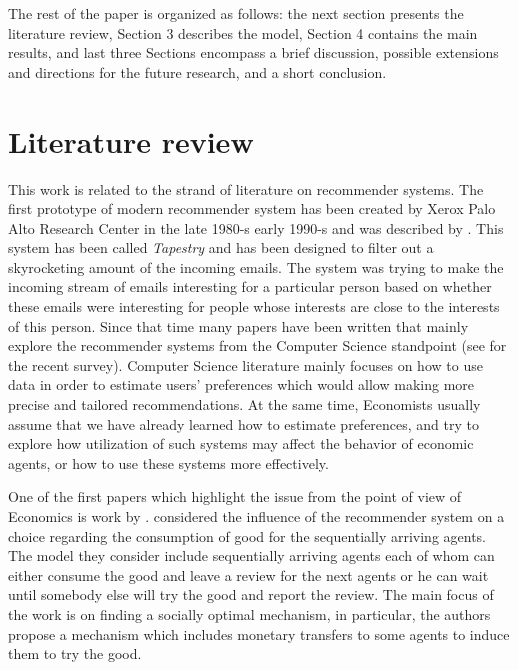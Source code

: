 \documentclass[a4paper]{article}
\begin{document}
The rest of the paper is organized as follows: the next section presents the literature review, Section 3 describes the model, Section 4 contains the main results, and last three Sections encompass a brief discussion, possible extensions and directions for the future research, and a short conclusion.

	
	
	
	
	\section{Literature review}
	
		This work is related to the strand of literature on recommender systems. The first prototype of modern recommender system has been created by Xerox Palo Alto Research Center in the late 1980-s early 1990-s and was described by  \cite{goldberg1992using}. This system has been called \textit{Tapestry} and has been designed to filter out a skyrocketing amount of the incoming emails. The system was trying to make the incoming stream of emails interesting for a particular person based on whether these emails were interesting for people whose interests are close to the interests of this person. Since that time many papers have been written that mainly explore the recommender systems from the Computer Science standpoint (see \cite{Beel2015r} for the recent survey). Computer Science literature mainly focuses on how to use data in order to estimate users' preferences which would allow making more precise and tailored recommendations. At the same time, Economists usually assume that we have already learned how to estimate preferences, and try to explore how utilization of such systems may affect the behavior of economic agents, or how to use these systems more effectively.
	
	
	
	
	
One of the first papers which highlight the issue from the point of view of Economics is work by \cite{avery1999market}. \cite{avery1999market} considered the influence of the recommender system on a choice regarding the consumption of good for the sequentially arriving agents. The model they consider include sequentially arriving agents each of whom can either consume the good and leave a review for the next agents or he can wait until somebody else will try the good and report the review. The main focus of the work is on finding a socially optimal mechanism, in particular, the authors propose a mechanism which includes monetary transfers to some agents to induce them to try the good.   
		
\end{document}
